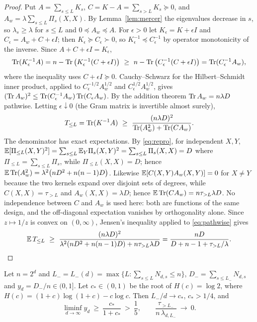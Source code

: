 \begin{proof}
Put $A=\sum_{s\le L}K_s$, $C=K-A=\sum_{s>L}K_s\succeq0$, and $A_w=\lambda\sum_{s\le L}\Pi_s(X,X)$. By
Lemma~\ref{lem:mercer} the eigenvalues decrease in $s$, so $\lambda_s\ge\lambda$ for $s\le L$ and
$0\preceq A_w\preceq A$. For $\epsilon>0$ let $K_\epsilon=K+\epsilon I$ and $C_\epsilon=A_w+C+\epsilon I$; then
$K_\epsilon\succeq C_\epsilon\succ0$, so $K_\epsilon^{-1}\preceq C_\epsilon^{-1}$ by operator monotonicity of the
inverse. Since $A+C+\epsilon I=K_\epsilon$,
\[
\operatorname{Tr}(K_\epsilon^{-1}A)=n-\operatorname{Tr}\big(K_\epsilon^{-1}(C+\epsilon I)\big)\ \ge\ n-\operatorname{Tr}\big(C_\epsilon^{-1}(C+\epsilon I)\big)
=\operatorname{Tr}(C_\epsilon^{-1}A_w),
\]
where the inequality uses $C+\epsilon I\succeq0$. Cauchy--Schwarz for the Hilbert--Schmidt inner product,
applied to $C_\epsilon^{-1/2}A_w^{1/2}$ and $C_\epsilon^{1/2}A_w^{1/2}$, gives
$(\operatorname{Tr} A_w)^2\le\operatorname{Tr}(C_\epsilon^{-1}A_w)\operatorname{Tr}(C_\epsilon A_w)$. By the addition theorem $\operatorname{Tr} A_w=n\lambda D$
pathwise. Letting $\epsilon\downarrow0$ (the Gram matrix is invertible almost surely),
\begin{equation}
T_{\le L}=\operatorname{Tr}(K^{-1}A)\ \ge\ \frac{(n\lambda D)^2}{\operatorname{Tr}(A_w^2)+\operatorname{Tr}(CA_w)}.
\label{eq:pathwise}
\end{equation}
The denominator has exact expectations. By \eqref{eq:repro}, for independent $X,Y$,
$\mathbb{E}[\Pi_{\le L}(X,Y)^2]=\sum_{s\le L}\mathbb{E}_Y\Pi_s(X,Y)^2=\sum_{s\le L}\Pi_s(X,X)=D$ where
$\Pi_{\le L}=\sum_{s\le L}\Pi_s$, while $\Pi_{\le L}(X,X)=D$; hence
$\mathbb{E}\operatorname{Tr}(A_w^2)=\lambda^2\big(nD^2+n(n-1)D\big)$. Likewise $\mathbb{E}[C(X,Y)A_w(X,Y)]=0$ for $X\ne Y$ because the
two kernels expand over disjoint sets of degrees, while $C(X,X)=\tau_{>L}$ and $A_w(X,X)=\lambda D$; hence
$\mathbb{E}\operatorname{Tr}(CA_w)=n\tau_{>L}\lambda D$. No independence between $C$ and $A_w$ is used here: both are functions of
the same design, and the off-diagonal expectation vanishes by orthogonality alone. Since $z\mapsto1/z$ is
convex on $(0,\infty)$, Jensen's inequality applied to \eqref{eq:pathwise} gives
\[
\mathbb{E}\,T_{\le L}\ \ge\ \frac{(n\lambda D)^2}{\lambda^2(nD^2+n(n-1)D)+n\tau_{>L}\lambda D}
=\frac{nD}{D+n-1+\tau_{>L}/\lambda}. \qedhere
\]
\end{proof}

\begin{lemma}\label{lem:window}
Let $n=2^d$ and $L_-=L_-(d)=\max\{L:\sum_{s\le L}N_{d,s}\le n\}$, $D_-=\sum_{s\le L_-}N_{d,s}$ and
$y_d=D_-/n\in(0,1]$. Let $c_*\in(0,1)$ be the root of $H(c)=\log2$, where
$H(c)=(1+c)\log(1+c)-c\log c$. Then $L_-/d\to c_*$, $c_*>1/4$, and
\begin{equation}
\liminf_{d\to\infty}y_d\ \ge\ \frac{c_*}{1+c_*}\ >\ \frac15,
\qquad
\frac{\tau_{>L_-}}{n\,\lambda_{d,L_-}}\ \longrightarrow\ 0 .
\label{eq:lastblock}
\end{equation}
\end{lemma}

